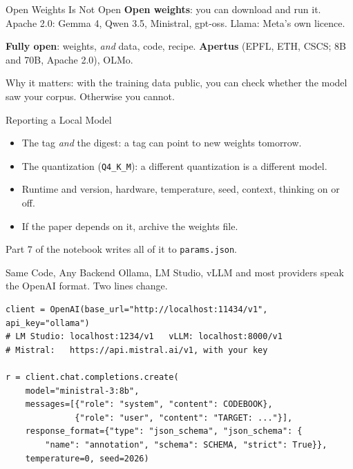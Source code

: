 \documentclass[svgnames,x11names,dvipsnames]{beamer}
\begin{document}
\begin{frame}{Open Weights Is Not Open}
\small
\textbf{Open weights}: you can download and run it. Apache 2.0: Gemma 4, Qwen 3.5, Ministral, gpt-oss. Llama: Meta's own licence.

\vspace{0.4cm}
\textbf{Fully open}: weights, \emph{and} data, code, recipe. \textbf{Apertus} (EPFL, ETH, CSCS; 8B and 70B, Apache 2.0), OLMo.

\vspace{0.6cm}
Why it matters: with the training data public, you can check whether the model saw your corpus. Otherwise you cannot.
\end{frame}

\begin{frame}{Reporting a Local Model}
\small
\begin{itemize}
    \setlength{\itemsep}{7pt}
    \item The tag \emph{and} the digest: a tag can point to new weights tomorrow.
    \item The quantization (\texttt{Q4\_K\_M}): a different quantization is a different model.
    \item Runtime and version, hardware, temperature, seed, context, thinking on or off.
    \item If the paper depends on it, archive the weights file.
\end{itemize}

\vspace{0.5cm}
Part 7 of the notebook writes all of it to \texttt{params.json}.
\end{frame}

\begin{frame}[fragile]{Same Code, Any Backend}
\small
Ollama, LM Studio, vLLM and most providers speak the OpenAI format. Two lines change.

\vspace{0.3cm}
{\scriptsize
\begin{verbatim}
client = OpenAI(base_url="http://localhost:11434/v1", api_key="ollama")
# LM Studio: localhost:1234/v1   vLLM: localhost:8000/v1
# Mistral:   https://api.mistral.ai/v1, with your key

r = client.chat.completions.create(
    model="ministral-3:8b",
    messages=[{"role": "system", "content": CODEBOOK},
              {"role": "user", "content": "TARGET: ..."}],
    response_format={"type": "json_schema", "json_schema": {
        "name": "annotation", "schema": SCHEMA, "strict": True}},
    temperature=0, seed=2026)
\end{verbatim}}
\end{frame}
\end{document}
